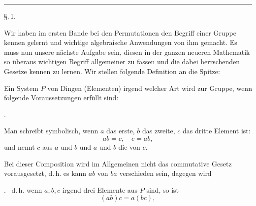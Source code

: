
\begin{center}

\vspace{1em}

\rule{2cm}{0.4pt}

\vspace{1em}
\S.\,1.

\end{center}

\noindent Wir haben im ersten Bande bei den Permutationen den Begriff einer Gruppe kennen gelernt und wichtige algebraische Anwendungen von ihm gemacht. Es muss nun unsere n\"achste Aufgabe sein, diesen in der ganzen neueren Mathematik so \"uberaus wichtigen Begriff allgemeiner zu fassen und die dabei herrschenden Gesetze kennen zu lernen. Wir stellen folgende Definition an die Spitze:

Ein System $P$ von Dingen (Elementen) irgend welcher Art wird zur Gruppe, wenn folgende Voraussetzungen erf\"ullt sind:

.\ 

Man schreibt symbolisch, wenn $a$ das erste, $b$ das zweite, $c$ das dritte Element ist:
\[
ab = c, \quad c = ab,
\]
und nennt $c$ aus $a$ und $b$  und $a$ und $b$ die  von $c$.

Bei dieser Composition wird im Allgemeinen nicht das commutative Gesetz vorausgesetzt, d.\,h. es kann $ab$ von $ba$ verschieden sein, dagegen wird

.\  d.\,h. wenn $a, b, c$ irgend drei Elemente aus $P$ sind, so ist
\[
(ab)c = a(bc),
\]

